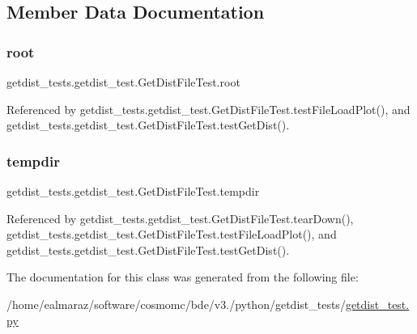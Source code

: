 \subsection{Member Data Documentation}
\mbox{\label{classgetdist__tests_1_1getdist__test_1_1GetDistFileTest_a1f61ef38e6df66878e69c3ba48482ba5}} 
\subsubsection{\texorpdfstring{root}{root}}
{\footnotesize\ttfamily getdist\+\_\+tests.\+getdist\+\_\+test.\+Get\+Dist\+File\+Test.\+root}



Referenced by getdist\+\_\+tests.\+getdist\+\_\+test.\+Get\+Dist\+File\+Test.\+test\+File\+Load\+Plot(), and getdist\+\_\+tests.\+getdist\+\_\+test.\+Get\+Dist\+File\+Test.\+test\+Get\+Dist().

\mbox{\label{classgetdist__tests_1_1getdist__test_1_1GetDistFileTest_ad921949ff7c737acc17504f743971e79}} 
\subsubsection{\texorpdfstring{tempdir}{tempdir}}
{\footnotesize\ttfamily getdist\+\_\+tests.\+getdist\+\_\+test.\+Get\+Dist\+File\+Test.\+tempdir}



Referenced by getdist\+\_\+tests.\+getdist\+\_\+test.\+Get\+Dist\+File\+Test.\+tear\+Down(), getdist\+\_\+tests.\+getdist\+\_\+test.\+Get\+Dist\+File\+Test.\+test\+File\+Load\+Plot(), and getdist\+\_\+tests.\+getdist\+\_\+test.\+Get\+Dist\+File\+Test.\+test\+Get\+Dist().



The documentation for this class was generated from the following file\+:\begin{DoxyCompactItemize}
\item 
/home/ealmaraz/software/cosmomc/bde/v3./python/getdist\+\_\+tests/\mbox{\hyperlink{getdist__test_8py}{getdist\+\_\+test.\+py}}\end{DoxyCompactItemize}
